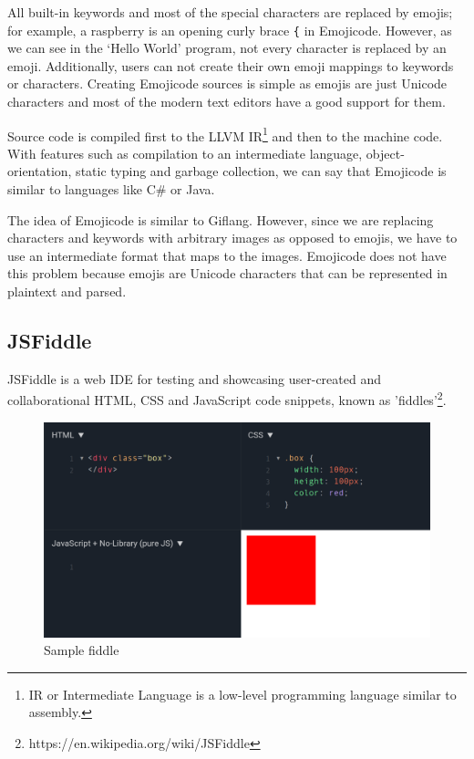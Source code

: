 All built-in keywords and most of the special characters are replaced by emojis; for example, a raspberry is an opening curly brace \texttt{\{} in Emojicode.
However, as we can see in the `Hello World' program, not every character is replaced by an emoji. Additionally, users can not create their own emoji
mappings to keywords or characters. Creating Emojicode sources is simple as emojis are just Unicode characters and most of the modern text editors
have a good support for them.

Source code is compiled first to the LLVM IR\footnote{IR or Intermediate Language is a low-level programming language similar to assembly.} and then to
the machine code. With features such as compilation to an intermediate language, object-orientation, static typing and garbage collection, we can
say that Emojicode is similar to languages like C\# or Java.

The idea of Emojicode is similar to Giflang. However, since we are replacing characters and keywords with arbitrary images as
opposed to emojis, we have to use an intermediate format that maps to the images. Emojicode does not have this problem because emojis are
Unicode characters that can be represented in plaintext and parsed.

\subsection{JSFiddle}
JSFiddle \cite{JSFiddle} is a web IDE for testing and showcasing user-created and collaborational HTML, CSS and JavaScript code snippets, known as
'fiddles'\footnote{https://en.wikipedia.org/wiki/JSFiddle}.

\begin{figure}[!hbt]
    \centering
	\includegraphics[width=\textwidth]{../img/jsfiddle}
	\caption{Sample fiddle}
	\label{fig:chap1:jsfiddle}
\end{figure}

